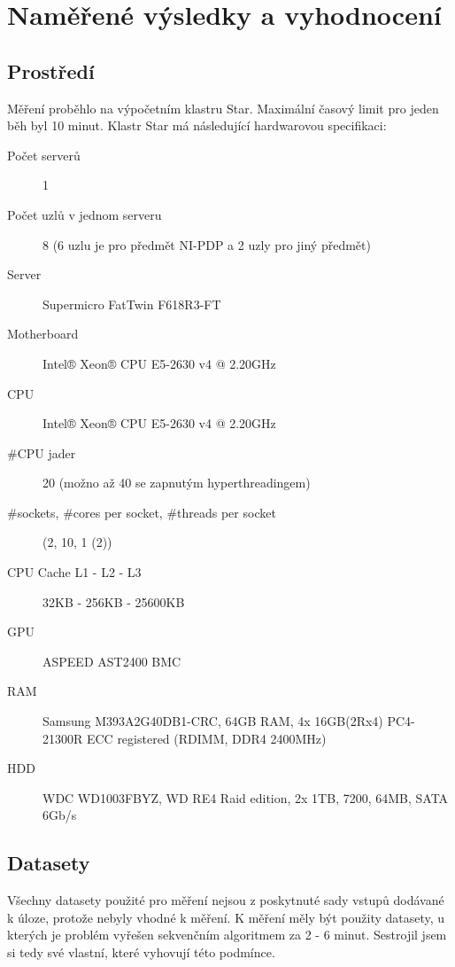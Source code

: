 \documentclass[a4paper,10pt]{article}
\begin{document}
\section{Naměřené výsledky a vyhodnocení}

\subsection*{Prostředí}
Měření proběhlo na výpočetním klastru Star. Maximální časový limit pro jeden běh byl 10 minut. Klastr Star má následující hardwarovou specifikaci:

\begin{description}
  \item[Počet serverů] 1
  \item[Počet uzlů v jednom serveru] 8 (6 uzlu je pro předmět NI-PDP a 2 uzly pro jiný předmět)
  \item[Server] Supermicro FatTwin F618R3-FT
  \item[Motherboard] Intel® Xeon® CPU E5-2630 v4 @ 2.20GHz
  \item[CPU] Intel® Xeon® CPU E5-2630 v4 @ 2.20GHz
  \item[\#CPU jader] 20 (možno až 40 se zapnutým hyperthreadingem)
  \item[\#sockets, \#cores per socket, \#threads per socket] (2, 10, 1 (2))
  \item[CPU Cache L1 - L2 - L3] 32KB - 256KB - 25600KB
  \item[GPU] ASPEED AST2400 BMC
  \item[RAM] Samsung M393A2G40DB1-CRC, 64GB RAM, 4x 16GB(2Rx4) PC4-21300R ECC registered (RDIMM, DDR4 2400MHz)
  \item[HDD] WDC WD1003FBYZ, WD RE4 Raid edition, 2x 1TB, 7200, 64MB, SATA 6Gb/s
\end{description}

\pagebreak

\subsection*{Datasety}
Všechny datasety použité pro měření nejsou z poskytnuté sady vstupů dodávané k úloze, protože nebyly vhodné k měření. K měření měly být použity datasety, u kterých je problém vyřešen sekvenčním algoritmem za 2 - 6 minut. Sestrojil jsem si tedy své vlastní, které vyhovují této podmínce.
\end{document}
